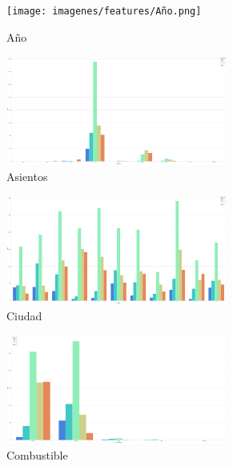 \begin{figure}[H]

\begin{subfigure}{.5\textwidth}
  \centering
  \texttt{[image: imagenes/features/Año.png]}
  \caption{Año}
\end{subfigure}%
\begin{subfigure}{.5\textwidth}
  \centering
  \includegraphics[width=0.8\textwidth]{imagenes/features/Asientos.png}
  \caption{Asientos}
\end{subfigure}
\begin{subfigure}{.5\textwidth}
  \centering
  \includegraphics[width=0.8\textwidth]{imagenes/features/Ciudad.png}
  \caption{Ciudad}
\end{subfigure}%
\begin{subfigure}{.5\textwidth}
  \centering
  \includegraphics[width=0.8\textwidth]{imagenes/features/Combustible.png}
  \caption{Combustible}
\end{subfigure}
\begin{subfigure}{.5\textwidth}

\end{subfigure}
\end{figure}
